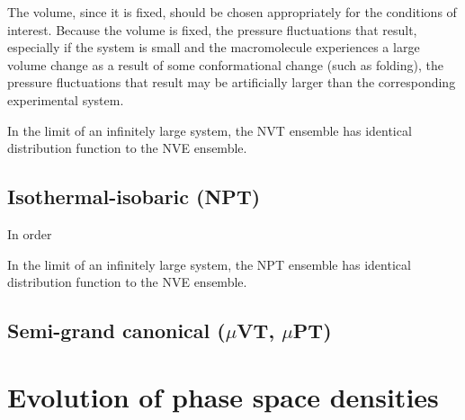 The volume, since it is fixed, should be chosen appropriately for the conditions of interest.
Because the volume is fixed, the pressure fluctuations that result, especially if the system is small and the macromolecule experiences a large volume change as a result of some conformational change (such as folding), the pressure fluctuations that result may be artificially larger than the corresponding experimental system.

In the limit of an infinitely large system, the NVT ensemble has identical distribution function to the NVE ensemble.

\subsection{Isothermal-isobaric (NPT)}
 

In order

In the limit of an infinitely large system, the NPT ensemble has identical distribution function to the NVE ensemble.

\subsection{Semi-grand canonical ($\mu$VT, $\mu$PT)}
 
 

\section{Evolution of phase space densities}

